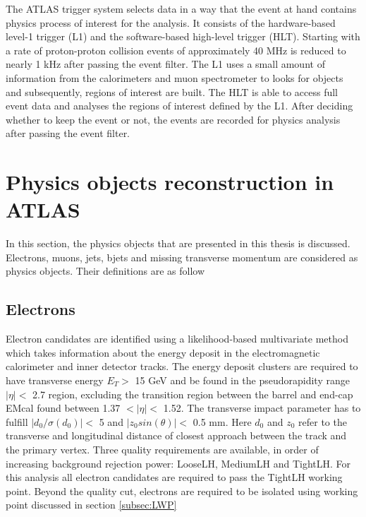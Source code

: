 The ATLAS trigger system selects data in a way that the event at hand contains physics process of interest for the analysis. It consists of the hardware-based level-1 trigger (L1) and the software-based high-level trigger (HLT). Starting with a rate of proton-proton collision events of approximately 40 MHz is reduced to nearly 1 kHz after passing the event filter. The L1 uses a small amount of information from the calorimeters and muon spectrometer to looks for objects and subsequently, regions of interest are built. The HLT is able to access full event data and analyses the regions of interest defined by the L1. After deciding whether to keep the event or not, the events are recorded for physics analysis after passing the event filter.  

\section{Physics objects reconstruction in ATLAS}

In this section, the physics objects that are presented in this thesis is discussed. Electrons, muons, jets, bjets and missing transverse momentum are considered as physics objects. Their definitions are as follow

\subsection{Electrons}
\label{subsec:electron}

Electron candidates are identified using a likelihood-based multivariate method which takes information about the energy deposit in the electromagnetic calorimeter and inner detector tracks. The energy deposit clusters are required to have transverse energy $E_{T}>$ 15 GeV and be found in the pseudorapidity range $|\eta|<$ 2.7 region, excluding the transition region between the barrel and end-cap EMcal found between 1.37 $<|\eta|<$ 1.52. The transverse impact parameter has to fulfill $|d_{0}/\sigma(d_{0})|<$ 5 and $|z_{0}sin(\theta)|<$ 0.5 mm. Here $d_{0}$ and $z_{0}$ refer to the transverse and longitudinal distance of closest approach between the track and the primary vertex. Three quality requirements are available, in order of increasing background rejection power: LooseLH, MediumLH and TightLH. For this analysis all electron candidates are required to pass the TightLH working point. Beyond the quality cut, electrons are required to be isolated using working point discussed in section \ref{subsec:LWP}

